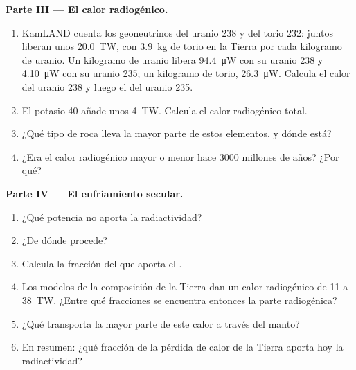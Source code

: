 \begin{problem}
\medskip
\noindent\textbf{Parte III --- El calor radiogénico.}
\begin{enumerate}[resume]
  \item KamLAND cuenta los geoneutrinos del uranio 238 y del torio 232: juntos
        liberan unos \qty{20.0}{TW}, con \qty{3.9}{kg} de torio en la Tierra
        por cada kilogramo de uranio. Un kilogramo de uranio libera
        \qty{94.4}{\micro W} con su uranio 238 y \qty{4.10}{\micro W} con su
        uranio 235; un kilogramo de torio, \qty{26.3}{\micro W}. Calcula el
        calor del uranio 238 y luego el del uranio 235.
  \item El potasio 40 añade unos \qty{4}{TW}. Calcula el calor radiogénico total.
  \item ¿Qué tipo de roca lleva la mayor parte de estos elementos, y dónde está?
  \item ¿Era el calor radiogénico mayor o menor hace 3000 millones de años? ¿Por qué?
\end{enumerate}

\medskip
\noindent\textbf{Parte IV --- El enfriamiento secular.}
\begin{enumerate}[resume]
  \item ¿Qué potencia no aporta la radiactividad?
  \item ¿De dónde procede?
  \item Calcula la fracción del  que aporta el .
  \item Los modelos de la composición de la Tierra dan un calor radiogénico de
        11 a \qty{38}{TW}.
        ¿Entre qué fracciones se encuentra entonces la parte radiogénica?
  \item ¿Qué transporta la mayor parte de este calor a través del manto?
  \item En resumen: ¿qué fracción de la pérdida de calor de la Tierra aporta
        hoy la radiactividad?
\end{enumerate}
\end{problem}
